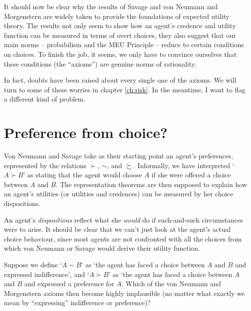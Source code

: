 
It should now be clear why the results of Savage and von Neumann and
Morgenstern are widely taken to provide the foundations of expected
utility theory. The results not only seem to show how an agent's
credence and utility function can be measured in terms of overt
choices, they also suggest that our main norms -- probabilism and the
MEU Principle -- reduce to certain conditions on choices. To finish
the job, it seems, we only have to convince ourselves that these
conditions (the ``axioms'') are genuine norms of rationality.

In fact, doubts have been raised about every single one of the axioms.
We will turn to some of these worries in chapter \ref{ch:risk}. In the
meantime, I want to flag a different kind of problem.

\section{Preference from choice?}\label{sec:preferences-choices}

Von Neumann and Savage take as their starting point an agent's
preferences, represented by the relations $\succ$, $\sim$, and
$\succsim$. Informally, we have interpreted `$A \succ B$' as stating
that the agent would choose $A$ if she were offered a choice between
$A$ and $B$. The representation theorems are then supposed to explain
how an agent's utilities (or utilities and credences) can be measured
by her choice dispositions.

An agent's \emph{dispositions} reflect what she \emph{would} do if
such-and-such circumstances were to arise. It should be clear that we
can't just look at the agent's actual choice behaviour, since most
agents are not confronted with all the choices from which von Neumann
or Savage would derive their utility function.

\begin{exercise2}
  Suppose we define `$A \sim B$' as `the agent has faced a choice between $A$
  and $B$ and expressed indifference', and `$A \succ B$' as `the agent has faced
  a choice between $A$ and $B$ and expressed a preference for $A$. Which of the
  von Neumann and Morgenstern axioms then become highly implausible (no matter
  what exactly we mean by ``expressing'' indifference or preference)?
\end{exercise2}

